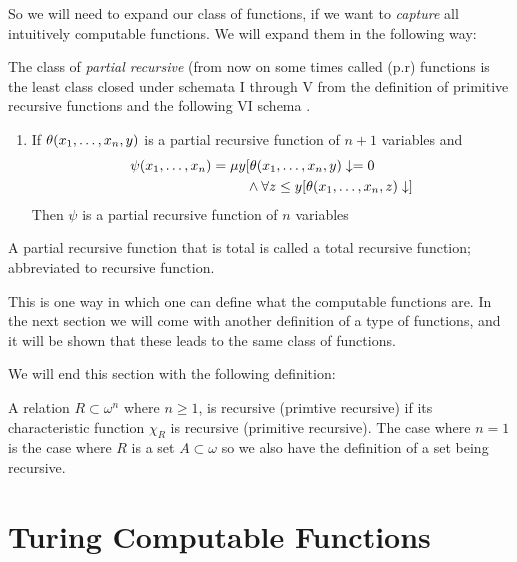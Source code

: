 \documentclass[../main.tex]{subfiles}
\begin{document}
So we will need to expand our class of functions, if we want to
\textit{capture} all intuitively computable functions. 
We will expand them in the following way:
\begin{defi}
		The class of \textit{partial recursive} (from now on some times
		called (p.r) functions is the least class closed under schemata
		I through V from the definition of primitive recursive
		functions and the following VI schema . 
		\begin{enumerate}[label=\Roman*., start=6]
			\item If $\theta(x_1,\ldots,x_n,y)$ is a partial recursive function
				of $n+1$ variables and 
				\begin{align*}
					\psi(x_1,\ldots,x_n)=\mu
					y&[\theta(x_1,\ldots,x_n,y)\downarrow=0\\
						&\wedge \forall z\leq y
					[\theta(x_1,\ldots,x_n,z)\downarrow]
				\end{align*}
				Then $\psi$ is a partial recursive function of
				$n$ variables
		\end{enumerate}
		A partial recursive function that is total is called a total
		recursive function; abbreviated to recursive function.
\end{defi}

This is one way in which one can define what the computable functions are. In
the next section we will come with another definition of a type of functions,
and it will be shown that these leads to the same class of functions.

We will end this section with the following definition:
\begin{defi}
	A relation $R\subset\omega^n$ where $n\geq 1$, is recursive (primtive
	recursive) if its characteristic function $\chi_R$ is recursive
	(primitive recursive). The case where $n=1$ is the case where $R$ is a
	set $A\subset\omega$ so we also have the definition of a set being
	recursive.
\end{defi}

\section{Turing Computable Functions}
\end{document}
